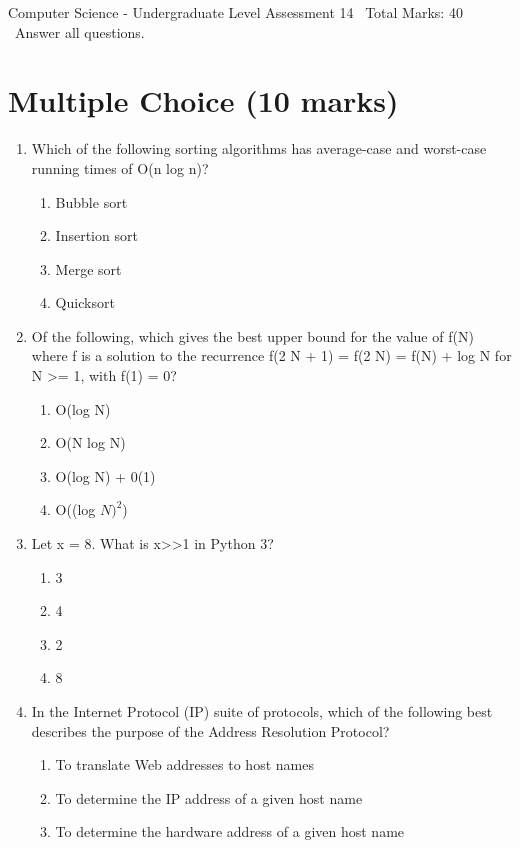 \documentclass[12pt]{article}
\begin{document}
\begin{center}
Computer Science - Undergraduate Level Assessment 14 \
Total Marks: 40 \
Answer all questions.
\end{center}

\section*{Multiple Choice (10 marks)}
\begin{enumerate}[label=\arabic*.]
\item Which of the following sorting algorithms has average-case and worst-case running times of O(n log n)?
\begin{enumerate}[label=(\alph*)]
    \item Bubble sort
    \item Insertion sort
    \item Merge sort
    \item Quicksort
\end{enumerate}
\item Of the following, which gives the best upper bound for the value of f(N) where f is a solution to the recurrence f(2 N + 1) = f(2 N) = f(N) + log N for N \textgreater{}= 1, with f(1) = 0?
\begin{enumerate}[label=(\alph*)]
    \item O(log N)
    \item O(N log N)
    \item O(log N) + 0(1)
    \item O((log $N)^2$)
\end{enumerate}
\item Let x = 8. What is x\textgreater{}\textgreater{}1 in Python 3?
\begin{enumerate}[label=(\alph*)]
    \item 3
    \item 4
    \item 2
    \item 8
\end{enumerate}
\item In the Internet Protocol (IP) suite of protocols, which of the following best describes the purpose of the Address Resolution Protocol?
\begin{enumerate}[label=(\alph*)]
    \item To translate Web addresses to host names
    \item To determine the IP address of a given host name
    \item To determine the hardware address of a given host name

\end{enumerate}
\end{enumerate}
\end{document}
